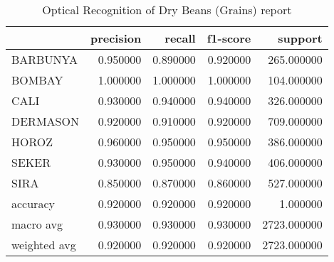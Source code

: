 \begin{table}
\caption{Optical Recognition of Dry Beans (Grains) report}
\begin{tabular}{lrrrr}
\toprule
 & precision & recall & f1-score & support \\
\midrule
BARBUNYA & 0.950000 & 0.890000 & 0.920000 & 265.000000 \\
BOMBAY & 1.000000 & 1.000000 & 1.000000 & 104.000000 \\
CALI & 0.930000 & 0.940000 & 0.940000 & 326.000000 \\
DERMASON & 0.920000 & 0.910000 & 0.920000 & 709.000000 \\
HOROZ & 0.960000 & 0.950000 & 0.950000 & 386.000000 \\
SEKER & 0.930000 & 0.950000 & 0.940000 & 406.000000 \\
SIRA & 0.850000 & 0.870000 & 0.860000 & 527.000000 \\
accuracy & 0.920000 & 0.920000 & 0.920000 & 1.000000 \\
macro avg & 0.930000 & 0.930000 & 0.930000 & 2723.000000 \\
weighted avg & 0.920000 & 0.920000 & 0.920000 & 2723.000000 \\
\bottomrule
\end{tabular}
\end{table}
